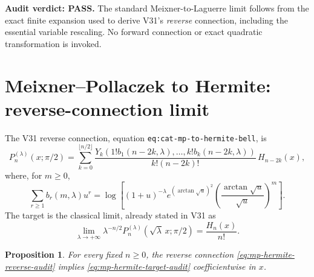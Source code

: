 \documentclass[11pt]{article}
\newtheorem{proposition}{Proposition}
\begin{document}
\noindent\textbf{Audit verdict: PASS.} The standard Meixner-to-Laguerre limit follows from the exact finite expansion used to derive V31's \emph{reverse} connection, including the essential variable rescaling. No forward connection or exact quadratic transformation is invoked.


\section{Meixner--Pollaczek to Hermite: reverse-connection limit}
The V31 reverse connection, equation \texttt{eq:cat-mp-to-hermite-bell}, is
\begin{equation}\label{eq:mp-hermite-reverse-audit}
P_n^{(\lambda)}(x;\pi/2)=\sum_{k=0}^{\lfloor n/2\rfloor}
\frac{Y_k(1!b_1(n-2k,\lambda),\ldots,k!b_k(n-2k,\lambda))}
{k!(n-2k)!}\,H_{n-2k}(x),
\end{equation}
where, for $m\ge0$,
\[
\sum_{r\ge1}b_r(m,\lambda)u^r
=\log\left[(1+u)^{-\lambda}e^{(\arctan\sqrt u)^2}
\left(\frac{\arctan\sqrt u}{\sqrt u}\right)^m\right].
\]
The target is the classical limit, already stated in V31 as
\begin{equation}\label{eq:mp-hermite-target-audit}
\lim_{\lambda\to+\infty}\lambda^{-n/2}
P_n^{(\lambda)}(\sqrt\lambda\,x;\pi/2)=\frac{H_n(x)}{n!}.
\end{equation}
\begin{proposition}
For every fixed $n\ge0$, the reverse connection \eqref{eq:mp-hermite-reverse-audit}
implies \eqref{eq:mp-hermite-target-audit} coefficientwise in $x$.
\end{proposition}
\end{document}
